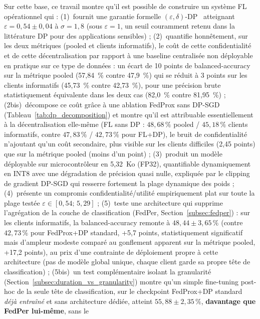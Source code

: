 \documentclass{article}
\begin{document}
Sur cette base, ce travail montre qu'il est possible de construire un système FL
opérationnel qui : (1)~fournit une garantie formelle $(\varepsilon,
\delta)$-DP~\cite{dwork2014foundations} atteignant $\varepsilon = 0{,}54 \pm 0{,}04$ à
$\sigma = 1{,}8$ (sous $\varepsilon = 1$, un seuil couramment retenu dans la littérature
DP pour des applications sensibles) ; (2)~quantifie honnêtement, sur les deux
métriques (pooled et clients informatifs), le coût de cette confidentialité et de cette
décentralisation par rapport à une baseline centralisée non déployable en pratique sur
ce type de données : un écart de 10 points de balanced-accuracy sur la métrique pooled
(57,84~\% contre 47,9~\%) qui se réduit à 3 points sur les clients informatifs
(45,73~\% contre 42,73~\%), pour une précision brute statistiquement équivalente dans
les deux cas (82,0~\% contre 81,95~\%) ; (2bis)~décompose ce coût grâce à une ablation
FedProx sans DP-SGD (Tableau~\ref{tab:dp_decomposition}) et montre qu'il est attribuable
essentiellement à la décentralisation elle-même (FL sans DP : $48{,}68\,\%$ pooled /
$45{,}18\,\%$ clients informatifs, contre $47{,}83\,\%$ / $42{,}73\,\%$ pour FL+DP), le
bruit de confidentialité n'ajoutant qu'un coût secondaire, plus visible sur les clients
difficiles (2,45 points) que sur la métrique pooled (moins d'un point) ; (3)~produit un
modèle déployable sur microcontrôleur en 5,32~Ko (FP32), quantifiable dynamiquement en
INT8 avec une dégradation de précision quasi nulle, expliquée par le clipping de
gradient DP-SGD qui resserre fortement la plage dynamique des poids ; (4)~présente un
compromis confidentialité/utilité empiriquement plat sur toute la plage testée
$\varepsilon \in [0{,}54;\, 5{,}29]$ ; (5)~teste une architecture qui supprime
l'agrégation de la couche de classification (FedPer, Section~\ref{subsec:fedper}) : sur
les clients informatifs, la balanced-accuracy remonte à $48{,}44 \pm 3{,}65\,\%$ (contre
$42{,}73\,\%$ pour FedProx+DP standard, +5,7 points, statistiquement significatif mais
d'ampleur modeste comparé au gonflement apparent sur la métrique pooled, +17,2 points),
au prix d'une contrainte de déploiement propre à cette architecture (pas de modèle
global unique, chaque client garde sa propre tête de classification) ; (5bis)~un test
complémentaire isolant la granularité (Section~\ref{subsec:duration_vs_granularity})
montre qu'un simple fine-tuning post-hoc de la seule tête de classification, sur le
checkpoint FedProx+DP standard \emph{déjà entraîné} et sans architecture dédiée,
atteint $55{,}88 \pm 2{,}35\,\%$, \textbf{davantage que FedPer lui-même}, sans le
\end{document}

